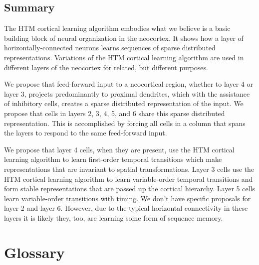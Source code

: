 \documentclass{report}
\begin{document}
\section*{Summary}


The HTM cortical learning algorithm embodies what we believe is a
basic building block of neural organization in the neocortex. It shows
how a layer of horizontally-connected neurons learns sequences of
sparse distributed representations. Variations of the HTM cortical
learning algorithm are used in different layers of the neocortex for
related, but different purposes.

We propose that feed-forward input to a neocortical region, whether to
layer 4 or layer 3, projects predominantly to proximal dendrites,
which with the assistance of inhibitory cells, creates a sparse
distributed representation of the input. We propose that cells in
layers 2, 3, 4, 5, and 6 share this sparse distributed
representation. This is accomplished by forcing all cells in a column
that spans the layers to respond to the same feed-forward input.

We propose that layer 4 cells, when they are present, use the HTM
cortical learning algorithm to learn first-order temporal transitions
which make representations that are invariant to spatial
transformations. Layer 3 cells use the HTM cortical learning algorithm
to learn variable-order temporal transitions and form stable
representations that are passed up the cortical hierarchy. Layer 5
cells learn variable-order transitions with timing. We don't have
specific proposals for layer 2 and layer 6. However, due to the
typical horizontal connectivity in these layers it is likely they,
too, are learning some form of sequence memory.

\chapter*{Glossary}
\label{glossary}
\end{document}
